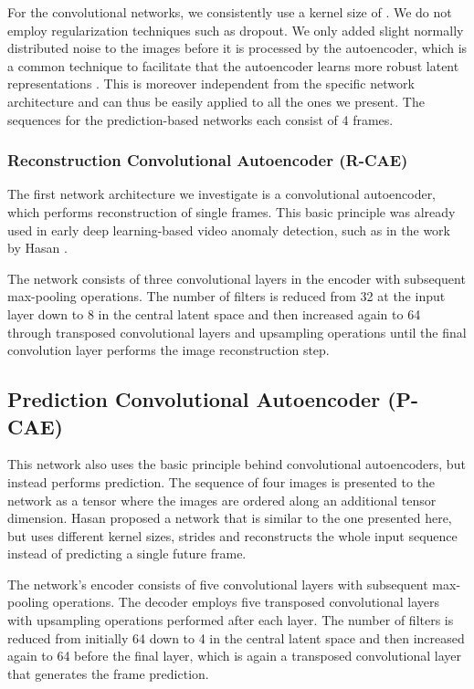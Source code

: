 \documentclass[10pt,twocolumn,letterpaper]{article}
\begin{document}
For the convolutional networks, we consistently use a kernel size of . We do not employ regularization techniques such as dropout. We only added slight normally distributed noise to the images before it is processed by the autoencoder, which is a common technique to facilitate that the autoencoder learns more robust latent representations \cite{denoising_ae}. This is moreover independent from the specific network architecture and can thus be easily applied to all the ones we present. The sequences for the prediction-based networks each consist of \num{4} frames.

\subsubsection{Reconstruction Convolutional Autoencoder (R-CAE)}
The first network architecture we investigate is a convolutional autoencoder, which performs reconstruction of single frames. This basic principle was already used in early deep learning-based video anomaly detection, such as in the work by Hasan \etal \cite{conv_ae_ad}.

The network consists of three convolutional layers in the encoder with subsequent  max-pooling operations. The number of filters is reduced from \num{32} at the input layer down to \num{8} in the central latent space and then increased again to \num{64} through transposed convolutional layers and upsampling operations until the final convolution layer performs the image reconstruction step.

\subsection{Prediction Convolutional Autoencoder (P-CAE)}
This network also uses the basic principle behind convolutional autoencoders, but instead performs prediction. The sequence of four images is presented to the network as a tensor where the images are ordered along an additional tensor dimension. Hasan \etal \cite{conv_ae_ad} proposed a network that is similar to the one presented here, but uses different kernel sizes, strides and reconstructs the whole input sequence instead of predicting a single future frame.

The network's encoder consists of five convolutional layers with subsequent  max-pooling operations. The decoder employs five transposed convolutional layers with  upsampling operations performed after each layer. The number of filters is reduced from initially \num{64} down to \num{4} in the central latent space and then increased again to \num{64} before the final layer, which is again a transposed convolutional layer that generates the frame prediction.
\end{document}
